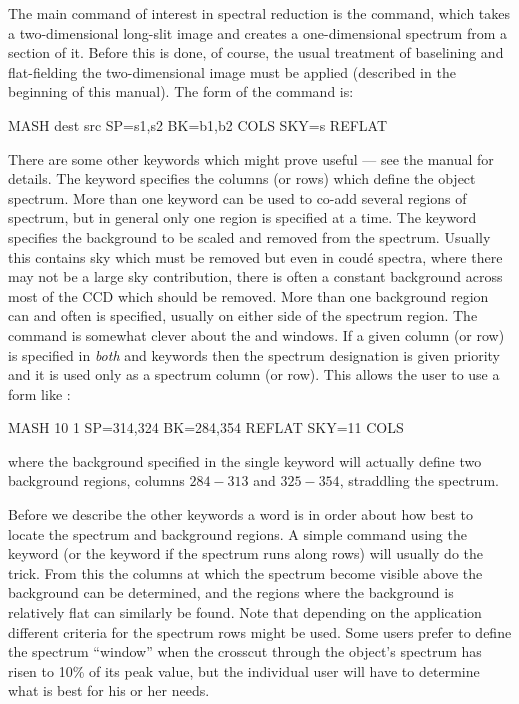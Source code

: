 The main command of interest in spectral reduction is the  command,
which takes a two-dimensional long-slit image and creates a one-dimensional
spectrum from a section of it.  Before this is done, of course, the usual
treatment of baselining and flat-fielding the two-dimensional image must be
applied (described in the beginning of this manual).  The form of the
 command is:
\begin{command}
 \item MASH dest src SP=s1,s2 BK=b1,b2 COLS SKY=s REFLAT
\end{command}
\noindent
There are some other keywords which might prove useful --- see the manual for
details.  The  keyword specifies the columns (or rows) which
define the object spectrum.  More than one  keyword can be used to
co-add several regions of spectrum, but in general only one region is
specified at a time.  The  keyword specifies the background to
be scaled and removed from the spectrum.  Usually this contains sky which must
be removed but even in coud\'e spectra, where there may not be a large sky
contribution, there is often a constant background across most of the CCD
which should be removed.  More than one background region can and often is
specified, usually on either side of the spectrum region.  The 
command is somewhat clever about the  and  windows. If a
given column (or row) is specified in {\it both}  and 
keywords then the spectrum designation is given priority and it is used only
as a spectrum column (or row).  This allows the user to use a form like :
\begin{command}
 \item MASH 10 1 SP=314,324 BK=284,354 REFLAT SKY=11 COLS
\end{command}
\noindent
where the background specified in the single  keyword will actually
define two background regions, columns $284-313$ and $325-354$, straddling the
spectrum.

Before we describe the other keywords a word is in order about how best to
locate the spectrum and background regions.  A simple  command
using the  keyword (or the  keyword if the spectrum runs
along rows) will usually do the trick. From this the columns at which the
spectrum become visible above the background can be determined, and the
regions where the background is relatively flat can similarly be found.  Note
that depending on the application different criteria for the spectrum rows
might be used.  Some users prefer to define the spectrum ``window'' when the
crosscut through the object's spectrum has risen to 10\% of its peak value,
but the individual user will have to determine what is best for his or her
needs.

